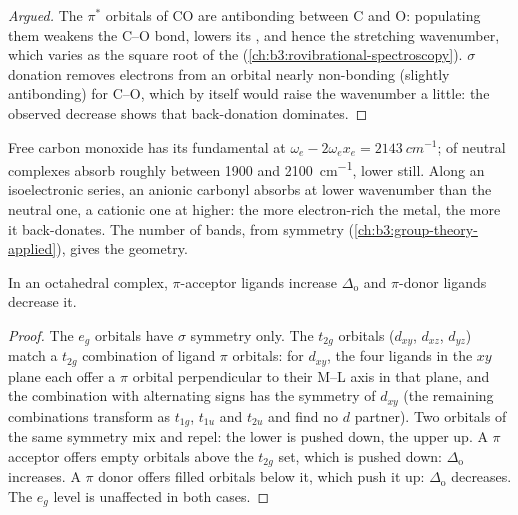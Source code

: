 \begin{proof}[Argued]
The $\pi^*$ orbitals of CO are antibonding between C and O: populating them weakens the
C--O bond, lowers its , and hence the stretching wavenumber, which
varies as the square root of the  (\cref{ch:b3:rovibrational-spectroscopy}).
$\sigma$ donation removes electrons from an orbital nearly non-bonding (slightly
antibonding) for C--O, which by itself would raise the wavenumber a little: the
observed decrease shows that back-donation dominates.
\end{proof}

Free carbon monoxide has its fundamental at $\omega_e - 2\omega_ex_e = \qty{2143}{cm^{-1}}$;  of neutral complexes absorb roughly between 1900 and \qty{2100}{cm^{-1}},
 lower still. Along an isoelectronic series, an anionic
carbonyl absorbs at lower wavenumber than the neutral one, a cationic one at
higher: the more electron-rich the metal, the more it back-donates. The number of
bands, from symmetry (\cref{ch:b3:group-theory-applied}), gives the geometry.

\begin{proposition}\label{prop:b3:organometallic-bonding:pi-delta}
In an octahedral complex, $\pi$-acceptor ligands increase $\Delta_{\mathrm o}$ and $\pi$-donor ligands
decrease it.
\end{proposition}

\begin{proof}
The $e_g$ orbitals have $\sigma$ symmetry only. The $t_{2g}$ orbitals ($d_{xy}$, $d_{xz}$, $d_{yz}$) match a $t_{2g}$
combination of ligand $\pi$ orbitals: for $d_{xy}$, the four ligands in the $xy$ plane each
offer a $\pi$ orbital perpendicular to their M--L axis in that plane, and the
combination with alternating signs has the symmetry of $d_{xy}$ (the remaining
combinations transform as $t_{1g}$, $t_{1u}$ and $t_{2u}$ and find no $d$ partner). Two orbitals of
the same symmetry mix and repel: the lower is pushed down, the upper up. A
$\pi$ acceptor offers empty orbitals above the $t_{2g}$ set, which is pushed down: $\Delta_{\mathrm o}$
increases. A $\pi$ donor offers filled orbitals below it, which push it up: $\Delta_{\mathrm o}$
decreases. The $e_g$ level is unaffected in both cases.
\end{proof}

